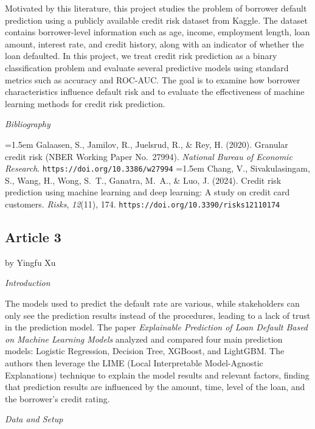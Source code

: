 \documentclass[letterpaper]{article}
\begin{document}
	Motivated by this literature, this project studies the problem of borrower default prediction using a publicly available credit risk dataset from Kaggle. The dataset contains borrower-level information such as age, income, employment length, loan amount, interest rate, and credit history, along with an indicator of whether the loan defaulted. In this project, we treat credit risk prediction as a binary classification problem and evaluate several predictive models using standard metrics such as accuracy and ROC-AUC. The goal is to examine how borrower characteristics influence default risk and to evaluate the effectiveness of machine learning methods for credit risk prediction.
	
	\bigskip
	
	\textit{Bibliography}
	
	\hangindent=1.5em
	Galaasen, S., Jamilov, R., Juelsrud, R., \& Rey, H. (2020). Granular credit risk (NBER Working Paper No.\ 27994). \textit{National Bureau of Economic Research}. \texttt{https://doi.org/10.3386/w27994}
	\hangindent=1.5em
	Chang, V., Sivakulasingam, S., Wang, H., Wong, S.~T., Ganatra, M.~A., \& Luo, J. (2024). Credit risk prediction using machine learning and deep learning: A study on credit card customers. \textit{Risks}, \textit{12}(11), 174. \texttt{https://doi.org/10.3390/risks12110174}
	
	\subsection{Article 3}
	
	{\color{deepred} by Yingfu Xu}
	
	
	\textit{Introduction}
	
	The models used to predict the default rate are various, while stakeholders can only see the prediction results instead of the procedures, leading to a lack of trust in the prediction model. The paper \textit{Explainable Prediction of Loan Default Based on Machine Learning Models} analyzed and compared four main prediction models: Logistic Regression, Decision Tree, XGBoost, and LightGBM. The authors then leverage the LIME (Local Interpretable Model-Agnostic Explanations) technique to explain the model results and relevant factors, finding that prediction results are influenced by the amount, time, level of the loan, and the borrower's credit rating.
	
	\medskip
	
	\textit{Data and Setup}
	
\end{document}
